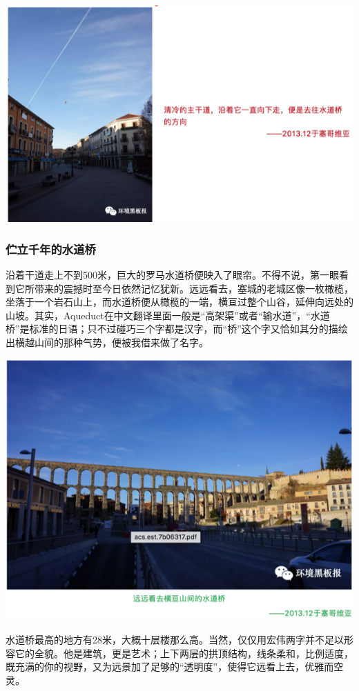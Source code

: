 \documentclass[]{book}
\begin{document}
\includegraphics[width=8.33in]{images/xt43}

\subsubsection{伫立千年的水道桥}

沿着干道走上不到500米，巨大的罗马水道桥便映入了眼帘。不得不说，第一眼看到它所带来的震撼时至今日依然记忆犹新。远远看去，塞城的老城区像一枚橄榄，坐落于一个岩石山上，而水道桥便从橄榄的一端，横亘过整个山谷，延伸向远处的山坡。其实，Aqueduct在中文翻译里面一般是``高架渠''或者``输水道''，``水道桥''是标准的日语；只不过碰巧三个字都是汉字，而``桥''这个字又恰如其分的描绘出横越山间的那种气势，便被我借来做了名字。

\includegraphics[width=8.33in]{images/xt44}

水道桥最高的地方有28米，大概十层楼那么高。当然，仅仅用宏伟两字并不足以形容它的全貌。他是建筑，更是艺术；上下两层的拱顶结构，线条柔和，比例适度，既充满的你的视野，又为远景加了足够的``透明度''，使得它远看上去，优雅而空灵。
\end{document}
